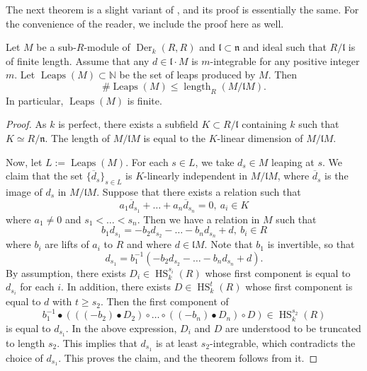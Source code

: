 \documentclass{amsart}
\newcommand{\HS}{\operatorname{HS}}
\begin{document}
The next theorem is a slight variant of \cite[Theorem 3.1]{bravo2024finitenessleapssensehasseschmidt}, \cite[Proposition 1.11]{NARVAEZMACARRO2024109441} and its proof is essentially the same. For the convenience of the reader, we include the proof here as well.

    \begin{theorem}\label{Her thm}
        Let $M$ be a sub-$R$-module of $\operatorname{Der}_k(R,R)$ and $\mathfrak{l}\subset \mathfrak{n}$ and ideal such that $R/\mathfrak{l}$ is of finite length. Assume that any $d\in \mathfrak{l}\cdot M$ is $m$-integrable for any positive integer $m$. Let $\operatorname{Leaps}(M)\subset \mathbb{N}$ be the set of leaps produced by $M$. Then $$\# \operatorname{Leaps}(M)\le \operatorname{length}_R(M/ \mathfrak{l}M).$$ In particular, $\operatorname{Leaps}(M)$ is finite.
    \end{theorem}

    \begin{proof}
        As $k$ is perfect, there exists a subfield $K\subset R/\mathfrak{l}$ containing $k$ such that $K\simeq R/\mathfrak{n}$. The length of $M/ \mathfrak{l} M$ is equal to the $K$-linear dimension of $M/ \mathfrak{l}M$.

        Now, let $L:=\operatorname{Leaps}(M)$. For each $s\in L$, we take $d_s\in M$ leaping at $s$. We claim that the set $\{\overline{d}_s\}_{s\in L}$ is $K$-linearly independent in $M/ \mathfrak{l}M$, where $\overline{d}_s$ is the image of $d_s$ in $M/ \mathfrak{l} M$.
        Suppose that there exists a relation such that
        $$a_1\overline{d}_{s_1}+\dots +a_n\overline{d}_{s_n}=0,\ a_i\in K$$
        where $a_1\neq 0$ and $s_1<\dots < s_n$. Then we have a relation in $M$ such that
        $$b_1d_{s_1}=-b_2d_{s_2}-\dots -b_nd_{s_n}+d,\ b_i\in R$$
        where $b_i$ are lifts of $a_i$ to $R$ and where $d\in \mathfrak{l}M$. Note that $b_1$ is invertible, so that 
        $$d_{s_1}=b_1^{-1}(-b_2d_{s_2}-\dots -b_nd_{s_n}+d).$$
        By assumption, there exists $D_i\in \HS_k^{s_i}(R)$ whose first component is equal to $d_{s_i}$ for each $i$. In addition, there exists $D\in \HS_k^{t}(R)$ whose first component is equal to $d$ with $t\ge s_2$. Then the first component of
        $$b_1^{-1}\bullet (((-b_2)\bullet D_2)\circ \dots \circ ((-b_n)\bullet D_n)\circ D)\in \HS_k^{s_2}(R)$$
        is equal to $d_{s_1}$. In the above expression, $D_i$ and $D$ are understood to be truncated to  length $s_2$. This implies that $d_{s_1}$ is at least $s_2$-integrable, which contradicts the choice of $d_{s_1}$. This proves the claim, and the theorem follows from it.
    \end{proof}
\end{document}
